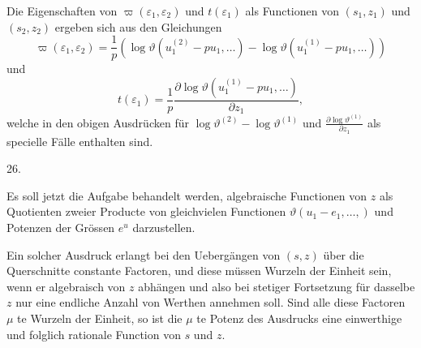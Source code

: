 \documentclass[a4paper,12pt,leqno]{article}
\begin{document}
Die Eigenschaften von
$\varpi (\varepsilon_1, \varepsilon_2)$
und $t(\varepsilon_1)$ als Functionen von $(s_1, z_1)$ und $(s_2, z_2)$
ergeben sich aus den Gleichungen
\[ \varpi (\varepsilon_1, \varepsilon_2)
   = \frac{1}{p}
      \left(
         \log \vartheta (u_1^{(2)} - p u_1,\ldots )
       - \log \vartheta (u_1^{(1)} - p u_1,\ldots )
      \right) \]
und
\[ t(\varepsilon_1)
   = \frac{1}{p} \frac{
      \partial \log \vartheta (u_1^{(1)} - p u_1,\ldots)}{
      \partial z_1},\]
welche in den obigen Ausdr\"{u}cken f\"{u}r
$\log \vartheta^{(2)} - \log \vartheta^{(1)}$
und
$\displaystyle \frac{\partial \log \vartheta^{(1)}}{\partial z_1}$
als specielle F\"{a}lle enthalten sind.

\medbreak

\centerline{26.}

\nobreak\medskip

Es soll jetzt die Aufgabe behandelt werden, algebraische
Functionen von $z$ als Quotienten zweier Producte von
gleichvielen Functionen
$\vartheta (u_1 - e_1,\ldots, )$
und Potenzen der Gr\"{o}ssen $e^u$ darzustellen.

Ein solcher Ausdruck erlangt bei den Ueberg\"{a}ngen von $(s,z)$
\"{u}ber die Querschnitte constante Factoren, und diese
m\"{u}ssen Wurzeln der Einheit sein, wenn er algebraisch von $z$
abh\"{a}ngen und also bei stetiger Fortsetzung f\"{u}r dasselbe
$z$ nur eine endliche Anzahl von Werthen annehmen soll.  Sind
alle diese Factoren $\mu \, \,$\-te Wurzeln der Einheit, so ist die
$\mu \, \,$\-te Potenz des Ausdrucks eine einwerthige und folglich
rationale Function von $s$ und $z$.
\end{document}
